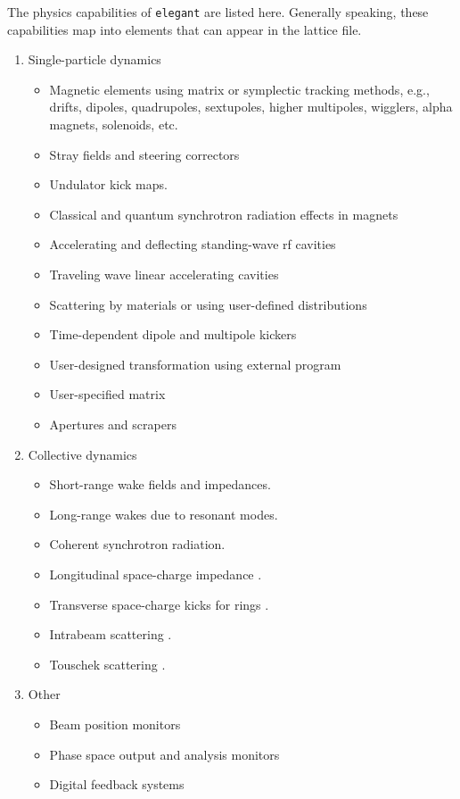 \documentclass[11pt]{article}
\begin{document}
The physics capabilities of {\tt elegant} are listed here.  Generally
speaking, these capabilities map into elements that can appear in the
lattice file.
\begin{enumerate}
\item Single-particle dynamics
  \begin{itemize}
  \item Magnetic elements using matrix or symplectic tracking methods, e.g.,
    drifts, dipoles, quadrupoles, sextupoles, higher multipoles, wigglers, alpha magnets, solenoids, etc.
  \item Stray fields and steering correctors
  \item Undulator kick maps\cite{Elleaume1992}.
  \item Classical and quantum synchrotron radiation effects in magnets
  \item Accelerating and deflecting standing-wave rf cavities
  \item Traveling wave linear accelerating cavities
  \item Scattering by materials or using user-defined distributions
  \item Time-dependent dipole and multipole kickers
  \item User-designed transformation using external program
  \item User-specified matrix
  \item Apertures and scrapers
  \end{itemize}
\item Collective dynamics
  \begin{itemize}
  \item Short-range wake fields and impedances.
  \item Long-range wakes due to resonant modes.
  \item Coherent synchrotron radiation.
  \item Longitudinal space-charge impedance \cite{Huang2004}.
  \item Transverse space-charge kicks for rings \cite{Xiao2007A}.
  \item Intrabeam scattering \cite{Xiao2008a}.
  \item Touschek scattering \cite{Xiao2010a}.
  \end{itemize}
\item Other
  \begin{itemize}
  \item Beam position monitors
  \item Phase space output and analysis monitors
  \item Digital feedback systems
  \end{itemize}
\end{enumerate}
\end{document}
